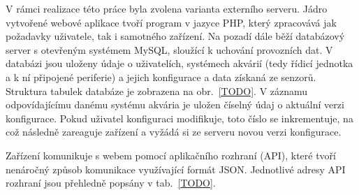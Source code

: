     V rámci realizace této práce byla zvolena varianta externího serveru. Jádro vytvořené webové aplikace tvoří program v jazyce PHP, který zpracovává jak požadavky uživatele, tak i samotného zařízení. Na pozadí dále běží databázový server s otevřeným systémem MySQL, sloužící k uchování provozních dat. V databázi jsou uloženy údaje o uživatelích, systémech akvárií (tedy řídicí jednotka a k ní připojené periferie) a jejich konfigurace a data získaná ze senzorů. Struktura tabulek databáze je zobrazena na obr.~\ref{TODO}. V záznamu odpovídajícímu danému systému akvária je uložen číselný údaj o aktuální verzi konfigurace. Pokud uživatel konfiguraci modifikuje, toto číslo se inkrementuje, na což následně zareaguje zařízení a vyžádá si ze serveru novou verzi konfigurace. 

    Zařízení komunikuje s webem pomocí aplikačního rozhraní (API), které tvoří nenáročný způsob komunikace využívající formát JSON. Jednotlivé adresy API rozhraní jsou přehledně popsány v tab.~\ref{TODO}. 

